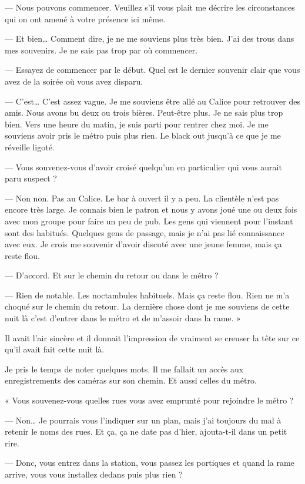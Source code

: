 — Nous pouvons commencer. Veuillez s'il vous plait me décrire les circonstances qui on ont amené à votre présence ici
même.

— Et bien… Comment dire, je ne me souviens plus très bien. J'ai des trous dans mes souvenirs. Je ne sais pas trop par
où commencer.

— Essayez de commencer par le début. Quel est le dernier souvenir clair que vous avez de la soirée où vous avez disparu.

— C'est… C'est assez vague. Je me souviens être allé au Calice pour retrouver des amis. Nous avons bu deux ou trois
bières. Peut-être plus. Je ne sais plus trop bien. Vers une heure du matin, je suis parti pour rentrer chez moi. Je me
souviens avoir pris le métro puis plus rien. Le black out jusqu'à ce que je me réveille ligoté.

— Vous souvenez-vous d'avoir croisé quelqu'un en particulier qui vous aurait paru suspect ?

— Non non. Pas au Calice. Le bar à ouvert il y a peu. La clientèle n'est pas encore très large. Je connais bien le
patron et nous y avons joué une ou deux fois avec mon groupe pour faire un peu de pub. Les gens qui viennent pour
l'instant sont des habitués. Quelques gens de passage, mais je n'ai pas lié connaissance avec eux. Je crois me souvenir 
d'avoir discuté avec une jeune femme, mais ça reste flou.

— D'accord. Et sur le chemin du retour ou dans le métro ?

— Rien de notable. Les noctambules habituels. Mais ça reste flou. Rien ne m'a choqué sur le chemin du retour. La
dernière chose dont je me souviens de cette nuit là c'est d'entrer dans le métro et de m'assoir dans la rame. »

Il avait l'air sincère et il donnait l'impression de vraiment se creuser la tête sur ce qu'il avait fait cette nuit là.

Je pris le temps de noter quelques mots. Il me fallait un accès aux enregistrements des caméras sur son chemin. Et
aussi celles du métro.

« Vous souvenez-vous quelles rues vous avez emprunté pour rejoindre le métro ?

— Non… Je pourrais vous l'indiquer sur un plan, mais j'ai toujours du mal à retenir le noms des rues. Et ça, ça ne date
pas d'hier, ajouta-t-il dans un petit rire.

— Donc, vous entrez dans la station, vous passez les portiques et quand la rame arrive, vous vous installez dedans puis
plus rien ?

